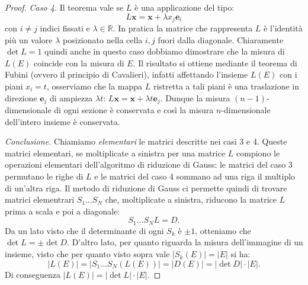 \documentclass[italian,a4paper]{scrartcl}
\newcommand{\RR}{{\mathbb R}}
\renewcommand{\vec}{\mathbf}
\begin{document}
\begin{proof}
\emph{Caso 4.}
Il teorema vale se $L$ è una applicazione del tipo:
\[
L \vec x = \vec x + \lambda x_j \vec e_i
\]
con $i\neq j$ indici fissati e $\lambda \in \RR$. 
In pratica la matrice che rappresenta $L$ è l'identità più un valore
$\lambda$ posizionato nella cella $i,j$ fuori dalla diagonale.
Chiaramente $\det L=1$ quindi anche in questo caso dobbiamo dimostrare
che la misura di $L(E)$ coincide con la misura di $E$. Il risultato si
ottiene mediante il teorema di Fubini (ovvero il principio di
Cavalieri), 
infatti affettando l'insieme $L(E)$ con i piani $x_i
= t$, osserviamo che la mappa $L$ ristretta a tali piani è una
traslazione in direzione $\vec e_j$ di ampiezza $\lambda t$:
$L\vec x = \vec x + \lambda t \vec e_j$. Dunque 
la misura $(n-1)$-dimensionale di ogni sezione è conservata e così la
misura $n$-dimensionale dell'intero insieme è conservata. 

\emph{Conclusione.}
Chiamiamo \emph{elementari} le matrici descritte nei
casi 3 e 4. Queste matrici elementari, se moltiplicate a sinistra per
una matrice $L$ compiono le operazioni elementari dell'algoritmo di
riduzione di Gauss: le matrici del caso 3 permutano le righe di $L$ e
le matrici del caso 4 sommano ad una riga il multiplo di un'altra
riga. Il metodo di riduzione di Gauss ci permette quindi di trovare 
matrici elementrari $S_1\dots S_N$ che, moltiplicate a
sinistra,
riducono la matrice
$L$ prima a scala e poi a diagonale:
\[
  S_1 \dots S_N L = D.
\]
Da un lato visto che il determinante di ogni $S_k$ è $\pm 1$,
otteniamo che $\det L = \pm \det D$. D'altro lato, per quanto riguarda
la misura dell'immagine di un insieme, visto che per quanto visto
sopra vale $\lvert S_k(E)\rvert = \lvert E \rvert$ si ha:
\[
\lvert L(E)\rvert = \lvert S_1 \dots S_N(L(E))\rvert = \lvert
D(E)\lvert = \lvert \det D \rvert\cdot \lvert E\rvert.
\]
Di conseguenza $\lvert L(E)\rvert = \lvert \det L\rvert \cdot \lvert E \rvert$. 
\end{proof}
\end{document}
